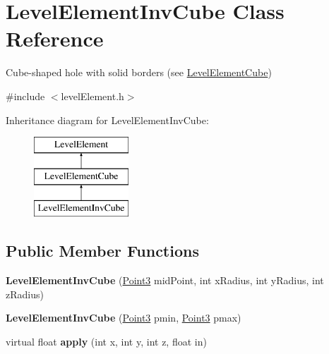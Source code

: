 \hypertarget{classLevelElementInvCube}{
\section{\-Level\-Element\-Inv\-Cube \-Class \-Reference}
\label{db/d77/classLevelElementInvCube}
}


\-Cube-\/shaped hole with solid borders (see \hyperlink{classLevelElementCube}{\-Level\-Element\-Cube})  




{\ttfamily \#include $<$level\-Element.\-h$>$}

\-Inheritance diagram for \-Level\-Element\-Inv\-Cube\-:\begin{figure}[H]
\begin{center}
\leavevmode
\includegraphics[height=3.000000cm]{db/d77/classLevelElementInvCube}
\end{center}
\end{figure}
\subsection*{\-Public \-Member \-Functions}
\begin{DoxyCompactItemize}
\item 
\hypertarget{classLevelElementInvCube_a7406176b44166c76ffedb23fd843985c}{
{\bfseries \-Level\-Element\-Inv\-Cube} (\hyperlink{classPoint3}{\-Point3} mid\-Point, int x\-Radius, int y\-Radius, int z\-Radius)}
\label{db/d77/classLevelElementInvCube_a7406176b44166c76ffedb23fd843985c}

\item 
\hypertarget{classLevelElementInvCube_afeb60a3b8d64201f4aef7f1724f12871}{
{\bfseries \-Level\-Element\-Inv\-Cube} (\hyperlink{classPoint3}{\-Point3} pmin, \hyperlink{classPoint3}{\-Point3} pmax)}
\label{db/d77/classLevelElementInvCube_afeb60a3b8d64201f4aef7f1724f12871}

\item 
\hypertarget{classLevelElementInvCube_a731dc81031151d6a99f7ead4c270f962}{
virtual float {\bfseries apply} (int x, int y, int z, float in)}
\label{db/d77/classLevelElementInvCube_a731dc81031151d6a99f7ead4c270f962}

\end{DoxyCompactItemize}


